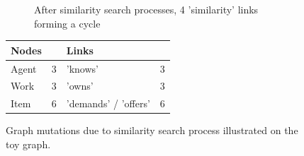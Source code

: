 \documentclass{article}
\begin{document}
\begin{figure}[H]
\begin{subfigure}{0.45\textwidth}
        \caption{After similarity search processes, 4 'similarity' links forming a cycle}
        \label{fig:small-after-processes}
    \end{subfigure}
    \addtocounter{subfigure}{-1}
    \scriptsize
    \begin{tabular}{ | L{2 cm}  L{0.5 cm} | L{3 cm}  L{0.5 cm} | }
    \hline
    \textbf{Nodes} &  & \textbf{Links} &   \\ \hline
    Agent & 3 & 'knows' & 3  \\ \hline
    Work & 3 & 'owns' & 3 \\ \hline
    Item & 6 & 'demands' / 'offers' & 6 \\ \hline
    \end{tabular}
    \caption{Graph mutations due to similarity search process illustrated on the toy graph.}
    \label{fig:graph-mutations-small-similarity-search}
\end{figure}
\end{document}
